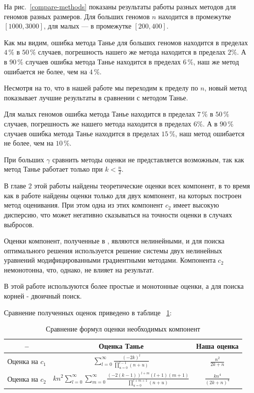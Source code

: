 На рис.~\ref{compare-methods} показаны результаты работы разных методов для геномов разных размеров.
Для больших геномов $n$ находится в промежутке $[1000, 3000]$, для малых --- в промежутке $[200, 400]$.

Как мы видим, ошибка метода Танье для больших геномов находится в пределах $4 \, \%$ в $50 \, \%$ случаев, погрешность нашего же метода находится в пределах $2 \%$.
А в $90 \, \%$ случаев ошибка метода Танье находится в пределах $6 \, \%$, наш же метод ошибается не более, чем на $4 \, \%$.

Несмотря на то, что в нашей работе мы переходим к пределу по $n$, новый метод показывает лучшие результаты в сравнении с методом Танье.

Для малых геномов ошибка метода Танье находится в пределах $7 \, \%$ в $50 \, \%$ случаев, погрешность же нашего метода находится в пределах $6 \%$.
А в $90 \, \%$ случаев ошибка метода Танье находится в пределах $15 \, \%$, наш метод ошибается не более, чем на $10 \, \%$.

При больших $\gamma$ сравнить методы оценки не представляется возможным, так как метод Танье работает только при $k < \frac n 2$.

В главе 2 этой работы найдены теоретические оценки всех компонент, в то время как в работе \cite{fr-4} найдены оценки только для двух компонент, на которых построен метод оценивания. 
При этом одна из этих компонент $c_2$ имеет высокую дисперсию, что может негативно сказываться на точности оценки в случаях выбросов.

Оценки компонент, полученные в \cite{fr-4}, являются нелинейными, и для поиска оптимального решения используется решение системы двух нелинейных уравнений модифицированными градиентными методами.
Компонента $c_2$ немонотонна, что, однако, не влияет на результат.

В этой работе используются более простые и монотонные оценки, а для поиска корней - двоичный поиск.

Сравнение полученных оценок приведено в таблице ~\ref{comp-compare}:
\def\arraystretch{1.4}
\begin{table}[!h]
    \caption{Сравнение формул оценки необходимых компонент}
    \centering
    \begin{tabular}{|*{3}{c|}}\hline
            --              & Оценка Танье & Наша оценка \\\hline
            Оценка на $c_1$ &
            \(\displaystyle \sum_{l=0}^{\infty} \frac{(-2k)^l} {\prod_{u=0}^{l-1} (n+u)} \) &
            \(\displaystyle \frac {n^2} {2k + n} \) \\
        \hline
            Оценка на $c_2$ &
            \(\displaystyle k n^2 \sum_{l=0}^{\infty} \sum_{m=0}^{\infty} \frac{(-2(k-1))^{l+m}(l+1)(m+1)} {\prod_{u=0}^{l+m+1} (n+u)} \) &
            \(\displaystyle \frac {k n^4} {(2k + n)^4} \) \\
        \hline
    \end{tabular}
    \label{comp-compare}
\end{table}

